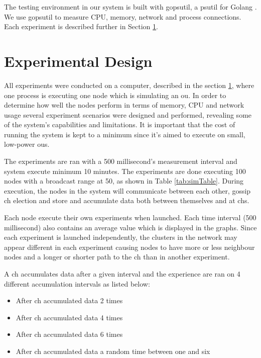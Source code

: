 \documentclass[USenglish]{uit-thesis}
\begin{document}
The testing environment in our system is built with gopsutil, a psutil for Golang \cite{golangPsutil}. We use gopsutil to measure CPU, memory, network and process connections. Each experiment is described further in Section \ref{eva:exp_des}.

\section{Experimental Design} \label{eva:exp_des}

All experiments were conducted on a computer, described in the section \ref{eva:exp_des}, where one process is executing one node which is simulating an \gls{ou}. In order to determine how well the nodes perform in terms of memory, CPU and network usage several experiment scenarios were designed and performed, revealing some of the system's capabilities and limitations. It is important that the cost of running the system is kept to a minimum since it's aimed to execute on small, low-power \gls{ou}s.

The experiments are ran with a 500 millisecond's measurement interval and system execute minimum 10 minutes. The experiments are done executing 100 nodes with a broadcast range at 50, as shown in Table \ref{tab:simTable}. During execution, the nodes in the system will communicate between each other, gossip \gls{ch} election and store and accumulate data both between themselves and at \gls{ch}s.

Each node execute their own experiments when launched. Each time interval (500 millisecond) also contains an average value which is displayed in the graphs. Since each experiment is launched  independently, the clusters in the network may appear different in each experiment causing nodes to have more or less neighbour nodes and a longer or shorter path to the \gls{ch} than in another experiment.

A \gls{ch} accumulates data after a given interval and the experience are ran on 4 different accumulation intervals as listed below:

\begin{itemize}
\item After \gls{ch} accumulated data 2 times
\item After \gls{ch} accumulated data 4 times
\item After \gls{ch} accumulated data 6 times
\item After \gls{ch} accumulated data a random time between one and six
\end{itemize}
\end{document}
